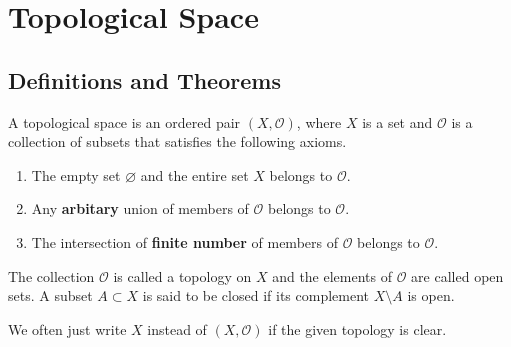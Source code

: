 \chapter{Topological Space}
\section{Definitions and Theorems}
\begin{defbox}
    \begin{definition}
        A {\color{maththen}topological space} is an {\color{mathobj}ordered pair} \((X, \mathcal{O})\), where \(X\) is a {\color{mathif}set} and \(\mathcal{O}\) is a {\color{mathif}collection of subsets} that satisfies the following {\color{mathrem}axioms}.
        \begin{enumerate}
            \item The {\color{mathif}empty set} \(\varnothing\) and the {\color{mathif}entire set} \(X\) belongs to \(\mathcal{O}\).
            \item Any \textbf{arbitary} {\color{mathif}union} of members of \(\mathcal{O}\) belongs to \(\mathcal{O}\).
            \item The {\color{mathif}intersection} of \textbf{finite number} of members of \(\mathcal{O}\) belongs to \(\mathcal{O}\).
        \end{enumerate}
        The {\color{mathobj}collection} \(\mathcal{O}\) is called a {\color{maththen}topology} on \(X\) and the {\color{mathobj}elements} of \(\mathcal{O}\) are called {\color{maththen}open sets}. A {\color{mathobj}subset} \(A \subset X\) is said to be {\color{maththen}closed} if its {\color{mathif}complement} \(X \setminus A\) is {\color{mathif}open}.

        We often just write \(X\) instead of \((X, \mathcal{O})\) if the given topology is clear.
    \end{definition}
\end{defbox}

